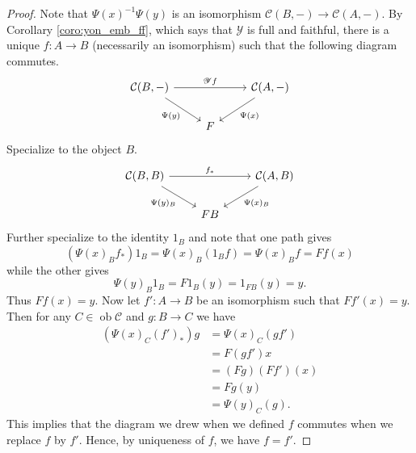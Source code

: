 \documentclass{report}
\DeclareMathOperator{\ob}{ob}
\theoremstyle{definition}
\theoremstyle{plain}
\theoremstyle{definition}
\begin{document}
		\begin{proof}
			Note that $\Psi(x)^{-1} \Psi(y)$ is an isomorphism $\mathcal{C}(B,-) \to \mathcal{C}(A,-)$. By Corollary \ref{coro:yon_emb_ff}, which says that $\mathscr{Y}$ is full and faithful, there is a unique $f\colon A \to B$ (necessarily an isomorphism) such that the following diagram commutes.
			\[\begin{tikzcd}
				{\mathcal{C}(B,-)} && {\mathcal{C}(A,-)} \\
				& F
				\arrow["{\mathscr{Y}f}", from=1-1, to=1-3]
				\arrow["{\Psi(y)}"', from=1-1, to=2-2]
				\arrow["{\Psi(x)}", from=1-3, to=2-2]
			\end{tikzcd}\]
			Specialize to the object $B$.
			\[\begin{tikzcd}
				{\mathcal{C}(B,B)} && {\mathcal{C}(A,B)} \\
				& FB
				\arrow["{f_*}", from=1-1, to=1-3]
				\arrow["{\Psi(y)_B}"', from=1-1, to=2-2]
				\arrow["{\Psi(x)_B}", from=1-3, to=2-2]
			\end{tikzcd}\]
			Further specialize to the identity $1_B$ and note that one path gives
			\begin{equation*}
				(\Psi(x)_Bf_*)1_B = \Psi(x)_B(1_Bf) = \Psi(x)_B f = Ff(x)
			\end{equation*}
			while the other gives 
			\[\Psi(y)_B1_B = F1_B(y) = 1_{FB} (y) = y.\]
			Thus $Ff(x) = y$. Now let $f'\colon A \to B$ be an isomorphism such that $Ff'(x) = y$. Then for any $C\in\ob\mathcal{C}$ and $g\colon B \to C$ we have
			\begin{align*}
				(\Psi(x)_C (f')_*)g &= \Psi(x)_C (gf')\\
				&= F(gf')x \\
				&= (Fg)(Ff')(x)\\
				&= Fg(y)\\
				&= \Psi(y)_C(g).
			\end{align*}
			This implies that the diagram we drew when we defined $f$ commutes when we replace $f$ by $f'$. Hence, by uniqueness of $f$, we have $f = f'$.
		\end{proof}
\end{document}
